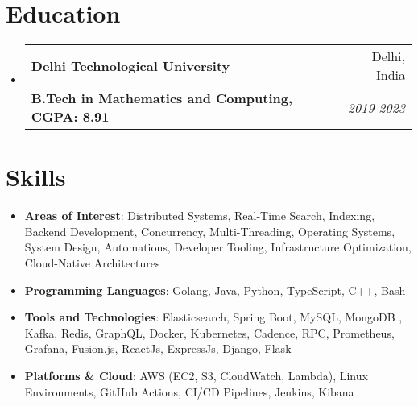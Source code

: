 \documentclass[letterpaper,10.8pt]{article}
\makeatletter
\newcommand{\resumeItem}[2]{
  \item\small{
    \textbf{#1}{: #2 \vspace{-2pt}}
  }
}
\newcommand{\resumeSubheading}[4]{
  \vspace{-1pt}\item
    \begin{tabular*}{0.97\textwidth}{l@{\extracolsep{\fill}}r}
      \textbf{#1} & #2 \\
      \textbf{#3} & \textit{\small #4} \\
    \end{tabular*}\vspace{-5pt}
}
\newcommand{\resumeSubItem}[2]{\resumeItem{#1}{#2}\vspace{-4pt}}
\newcommand{\resumeSubHeadingListStart}{\begin{itemize}[leftmargin=*]}
\newcommand{\resumeSubHeadingListEnd}{\end{itemize}}
\makeatother
\begin{document}



\section{Education}
  \resumeSubHeadingListStart
    \resumeSubheading
      {Delhi Technological University}{Delhi, India }
      {B.Tech in Mathematics and Computing,  CGPA: 8.91}{2019-2023}
  \resumeSubHeadingListEnd


\section{Skills}
  \resumeSubHeadingListStart
	\resumeSubItem{Areas of Interest}{Distributed Systems, Real-Time Search, Indexing, Backend Development, Concurrency, Multi-Threading, Operating Systems, System Design, Automations, Developer Tooling, Infrastructure Optimization, Cloud-Native Architectures}
  
    \resumeSubItem{Programming Languages}{Golang, Java, Python, TypeScript, C++, Bash}
    
    \resumeSubItem{Tools and Technologies}{Elasticsearch, Spring Boot, MySQL, MongoDB , Kafka, Redis, GraphQL, Docker, Kubernetes, Cadence, RPC, Prometheus, Grafana, Fusion.js, ReactJs, ExpressJs, Django, Flask}
    
    \resumeSubItem{Platforms \& Cloud}{AWS (EC2, S3, CloudWatch, Lambda), Linux Environments, GitHub Actions, CI/CD Pipelines, Jenkins, Kibana}
\resumeSubHeadingListEnd
\end{document}
